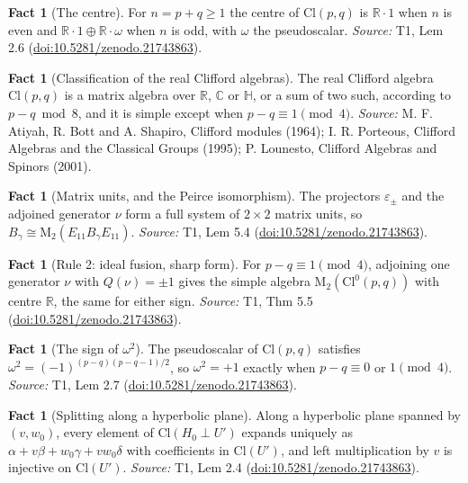\documentclass[11pt]{article}
\theoremstyle{definition}
\newtheorem{fact}[theorem]{Fact}
\theoremstyle{plain}
\providecommand{\C}{}\renewcommand{\C}{\mathbb{C}}
\providecommand{\Cl}{}\renewcommand{\Cl}{\mathrm{Cl}}
\providecommand{\HH}{}\renewcommand{\HH}{\mathbb{H}}
\providecommand{\Mat}{}\renewcommand{\Mat}{\mathrm{M}}
\providecommand{\R}{}\renewcommand{\R}{\mathbb{R}}
\begin{document}
\begin{fact}[The centre]\label{c:transport.centre}
For $n = p + q \geq 1$ the centre of $\Cl(p,q)$ is $\R \cdot 1$ when $n$ is even and $\R \cdot 1 \oplus \R \cdot \omega$ when $n$ is odd, with $\omega$ the pseudoscalar.
\emph{Source:} T1, Lem 2.6 (\href{https://doi.org/10.5281/zenodo.21743863}{doi:10.5281/zenodo.21743863}).
\end{fact}

\begin{fact}[Classification of the real Clifford algebras]\label{c:transport.classification-real-clifford-algebras}
The real Clifford algebra $\Cl(p,q)$ is a matrix algebra over $\R$, $\C$ or $\HH$, or a sum of two such, according to $p - q \bmod 8$, and it is simple except when $p - q \equiv 1 \pmod 4$.
\emph{Source:} M. F. Atiyah, R. Bott and A. Shapiro, Clifford modules (1964); I. R. Porteous, Clifford Algebras and the Classical Groups (1995); P. Lounesto, Clifford Algebras and Spinors (2001).
\end{fact}

\begin{fact}[Matrix units, and the Peirce isomorphism]\label{c:transport.matrix-units-peirce-isomorphism}
The projectors $\varepsilon_\pm$ and the adjoined generator $\nu$ form a full system of $2 \times 2$ matrix units, so $B_\gamma \cong \Mat_2(E_{11} B_\gamma E_{11})$.
\emph{Source:} T1, Lem 5.4 (\href{https://doi.org/10.5281/zenodo.21743863}{doi:10.5281/zenodo.21743863}).
\end{fact}

\begin{fact}[Rule 2: ideal fusion, sharp form]\label{c:transport.rule-2-ideal-fusion-sharp-form}
For $p - q \equiv 1 \pmod 4$, adjoining one generator $\nu$ with $Q(\nu) = \pm 1$ gives the simple algebra $\Mat_2(\Cl^0(p,q))$ with centre $\R$, the same for either sign.
\emph{Source:} T1, Thm 5.5 (\href{https://doi.org/10.5281/zenodo.21743863}{doi:10.5281/zenodo.21743863}).
\end{fact}

\begin{fact}[The sign of $\omega^2$]\label{c:transport.sign}
The pseudoscalar of $\Cl(p,q)$ satisfies $\omega^2 = (-1)^{(p-q)(p-q-1)/2}$, so $\omega^2 = +1$ exactly when $p - q \equiv 0$ or $1 \pmod 4$.
\emph{Source:} T1, Lem 2.7 (\href{https://doi.org/10.5281/zenodo.21743863}{doi:10.5281/zenodo.21743863}).
\end{fact}

\begin{fact}[Splitting along a hyperbolic plane]\label{c:transport.splitting-along-hyperbolic-plane}
Along a hyperbolic plane spanned by $(v, w_0)$, every element of $\Cl(H_0 \perp U')$ expands uniquely as $\alpha + v\beta + w_0\gamma + v w_0\delta$ with coefficients in $\Cl(U')$, and left multiplication by $v$ is injective on $\Cl(U')$.
\emph{Source:} T1, Lem 2.4 (\href{https://doi.org/10.5281/zenodo.21743863}{doi:10.5281/zenodo.21743863}).
\end{fact}
\end{document}
